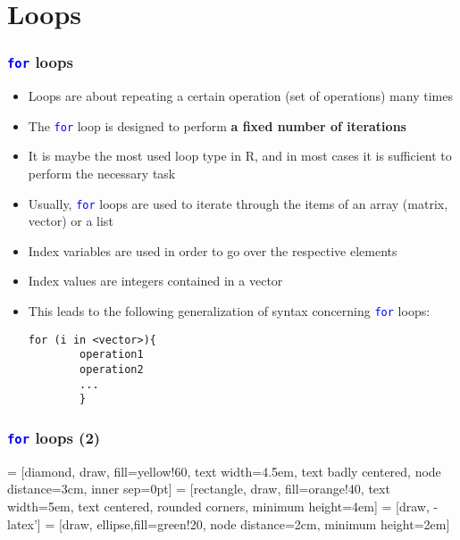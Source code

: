 \documentclass[10pt]{beamer}
\newcommand{\cc}[1]{\texttt{\textcolor{blue}{#1}}}
\theoremstyle{definition}
\begin{document}
\section{Loops}
\begin{frame}[fragile]
\frametitle{\cc{for} loops}
\begin{itemize}
	\item Loops are about repeating a certain operation (set of operations) many times
	\item The \cc{for} loop is designed to perform \textbf{a fixed number of iterations}
	\item It is maybe the most used loop type in R, and in most cases it is sufficient to perform the necessary task
	\item Usually, \cc{for} loops are used to iterate through the items of an array (matrix, vector) or a list
	\item Index variables are used in order to go over the respective elements
	\item Index values are integers contained in a vector
	\item This leads to the following generalization of syntax concerning \cc{for} loops:
	\begin{lstlisting}[style = rstyle, breaklines]
	for (i in <vector>){
		operation1
		operation2
		...
		}
	\end{lstlisting}
\end{itemize}
\end{frame}

\begin{frame}[fragile]
\frametitle{\cc{for} loops (2)}
 = [diamond, draw, fill=yellow!60, 
    text width=4.5em, text badly centered, node distance=3cm, inner sep=0pt]
 = [rectangle, draw, fill=orange!40, 
    text width=5em, text centered, rounded corners, minimum height=4em]
 = [draw, -latex']
 = [draw, ellipse,fill=green!20, node distance=2cm,
    minimum height=2em]

\begin{center}
\end{center} 
\end{frame}
\end{document}
